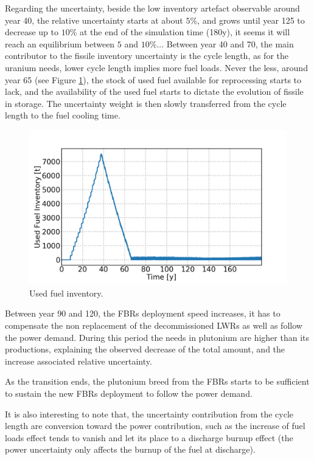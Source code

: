 \documentclass{anstrans}
\begin{document}
Regarding the uncertainty, beside the low inventory artefact observable around
year 40, the relative uncertainty starts at about $5\%$, and grows until year
125 to decrease up to $10\%$ at the end of the simulation time (180y), it seems
it will reach an equilibrium between $5$ and $10\%$...
Between year 40 and 70, the main contributor to the fissile inventory
uncertainty is the cycle length, as for the uranium needs, lower cycle length
implies more fuel loads. Never the less, around year 65 (see Figure
\ref{fig:used_fuel}), the stock of used fuel available for reprocessing starts
to lack, and the availability of the used fuel starts to dictate the evolution
of fissile in storage. The uncertainty weight is then slowly transferred from
the cycle length to the fuel cooling time.

\begin{figure}[ht] %
    \centering
    \includegraphics[scale=0.17]{used_fuel}
    \caption{Used fuel inventory.}\label{fig:used_fuel}
\end{figure}
Between year 90 and 120, the \glspl{FBR} deployment speed increases, it has to
compensate the non replacement of the decommissioned \glspl{LWR} as well as
follow the power demand. During this period the needs in plutonium are higher
than its productions, explaining the observed decrease of the total amount, and
the increase associated relative uncertainty.

As the transition ends, the plutonium breed from the \glspl{FBR} starts to be
sufficient to sustain the new \glspl{FBR} deployment to follow the power demand. 

It is also interesting to note that, the uncertainty contribution from the cycle
length are conversion toward the power contribution, such as the increase of
fuel loads effect tends to vanish and let its place to a discharge burnup
effect (the power uncertainty only affects the burnup of the fuel at discharge).
\end{document}
